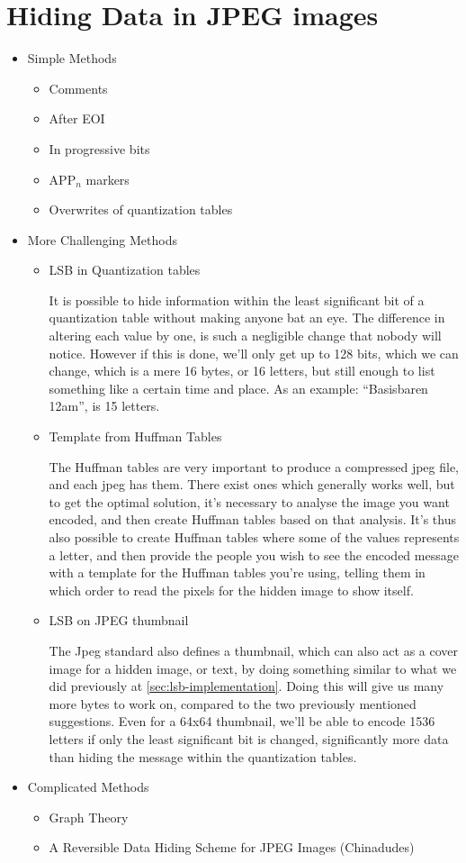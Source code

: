 
\section{Hiding Data in JPEG images}

\begin{itemize}
	\item Simple Methods
	\begin{itemize}
		\item Comments
		\item After EOI
		\item In progressive bits
		\item APP$_n$ markers
		\item Overwrites of quantization tables
	\end{itemize}
	\item More Challenging Methods
	\begin{itemize}
		\item LSB in Quantization tables
		
		It is possible to hide information within the least significant bit of a quantization table without making anyone bat an eye. 
		The difference in altering each value by one, is such a negligible change that nobody will notice. 
		However if this is done, we'll only get up to 128 bits, which we can change, which is a mere 16 bytes, or 16 letters, but still enough to list something like a certain time and place. 
		As an example: ``Basisbaren 12am'', is 15 letters.
		\item Template from Huffman Tables
		
		The Huffman tables are very important to produce a compressed jpeg file, and each jpeg has them. 
		There exist ones which generally works well, but to get the optimal solution, it's necessary to analyse the image you want encoded, and then create Huffman tables based on that analysis. 
		It's thus also possible to create Huffman tables where some of the values represents a letter, and then provide the people you wish to see the encoded message with a template for the Huffman tables you're using, telling them in which order to read the pixels for the hidden image to show itself.
		\item LSB on JPEG thumbnail
		
		The Jpeg standard also defines a thumbnail, which can also act as a cover image for a hidden image, or text, by doing something similar to what we did previously at \ref{sec:lsb-implementation}.
		Doing this will give us many more bytes to work on, compared to the two previously mentioned suggestions. 
		Even for a 64x64 thumbnail, we'll be able to encode 1536 letters if only the least significant bit is changed, significantly more data than hiding the message within the quantization tables.
	\end{itemize}
	\item Complicated Methods
	\begin{itemize}
		\item Graph Theory
		\item A Reversible Data Hiding Scheme for JPEG Images (Chinadudes)
	\end{itemize}
\end{itemize}